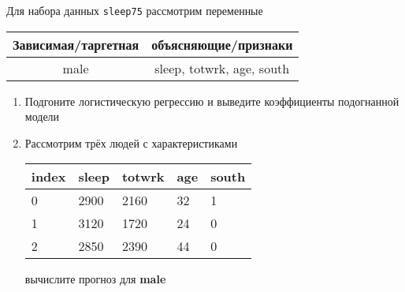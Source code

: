 \begin{exercise}
Для набора данных \texttt{sleep75} рассмотрим переменные

\begin{center}
	\begin{tabular}{|c|c|} \hline
		Зависимая/таргетная & объясняющие/признаки \\ \hline
		male & sleep, totwrk, age, south \\ \hline
	\end{tabular}
\end{center}
\begin{enumerate}
	\item Подгоните логистическую регрессию и выведите коэффициенты подогнанной модели
	\item Рассмотрим трёх людей с характеристиками
	\begin{center}
		\begin{tabular}{|l||l|l|l|l|}\hline
			index & sleep & totwrk & age & south  \\ \hline\hline
			0 & 2900 & 2160 & 32 & 1  \\
			1 & 3120 & 1720 & 24 & 0  \\
			2 & 2850 & 2390 & 44 & 0  \\ \hline
		\end{tabular}
	\end{center}
	вычислите прогноз для \textbf{male} 
\end{enumerate}
\end{exercise}

